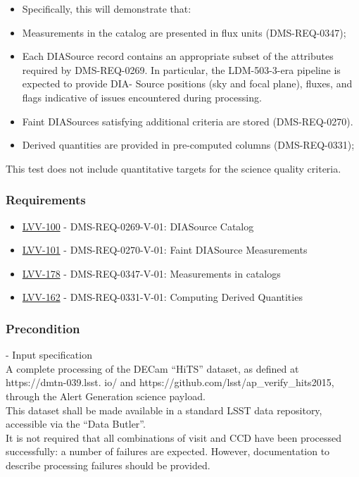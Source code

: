 \begin{itemize}
\tightlist
\item
  Specifically, this will demonstrate that:
\item
  Measurements in the catalog are presented in flux units
  (DMS-REQ-0347);
\item
  Each DIASource record contains an appropriate subset of the attributes
  required by DMS-REQ-0269. In particular, the LDM-503-3-era pipeline is
  expected to provide DIA- Source positions (sky and focal plane),
  fluxes, and flags indicative of issues encountered during processing.
\item
  Faint DIASources satisfying additional criteria are stored
  (DMS-REQ-0270).
\item
  Derived quantities are provided in pre-computed columns
  (DMS-REQ-0331);
\end{itemize}

This test does not include quantitative targets for the science quality
criteria.\\[2\baselineskip]

\subsubsection{Requirements}\label{requirements-4}

\begin{itemize}
\tightlist
\item
  \href{https://jira.lsstcorp.org/browse/LVV-100}{LVV-100} -
  DMS-REQ-0269-V-01: DIASource Catalog
\item
  \href{https://jira.lsstcorp.org/browse/LVV-101}{LVV-101} -
  DMS-REQ-0270-V-01: Faint DIASource Measurements
\item
  \href{https://jira.lsstcorp.org/browse/LVV-178}{LVV-178} -
  DMS-REQ-0347-V-01: Measurements in catalogs
\item
  \href{https://jira.lsstcorp.org/browse/LVV-162}{LVV-162} -
  DMS-REQ-0331-V-01: Computing Derived Quantities
\end{itemize}

\subsubsection{Precondition}\label{precondition-4}

- Input specification\\[2\baselineskip]A complete processing of the
DECam ``HiTS'' dataset, as defined at https://dmtn-039.lsst. io/ and
https://github.com/lsst/ap\_verify\_hits2015, through the Alert
Generation science payload.\\
This dataset shall be made available in a standard LSST data repository,
accessible via the ``Data Butler''.\\
It is not required that all combinations of visit and CCD have been
processed successfully: a number of failures are expected. However,
documentation to describe processing failures should be provided.

